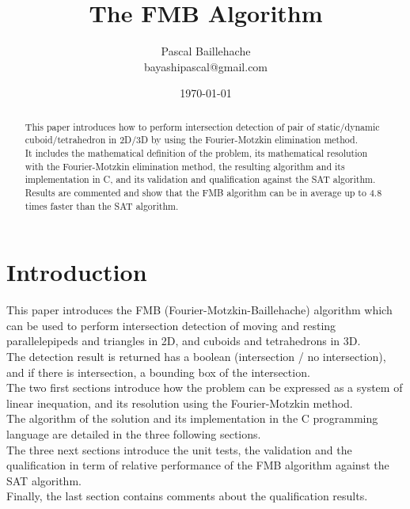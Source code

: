 \documentclass[12pt, a4paper]{article}
\begin{document}
\title{The FMB Algorithm}
\author{Pascal Baillehache\\bayashipascal@gmail.com}
\date{\today}
\maketitle

\begin{abstract}
This paper introduces how to perform intersection detection of pair of static/dynamic cuboid/tetrahedron in 2D/3D by using the Fourier-Motzkin elimination method.\\
It includes the mathematical definition of the problem, its mathematical resolution with the Fourier-Motzkin elimination method, the resulting algorithm and its implementation in C, and its validation and qualification against the SAT algorithm. Results are commented and show that the FMB algorithm can be in average up to 4.8 times faster than the SAT algorithm.
\end{abstract}

\newpage
\tableofcontents

\section*{Introduction}

This paper introduces the FMB (Fourier-Motzkin-Baillehache) algorithm which can be used to perform intersection detection of moving and resting parallelepipeds and triangles in 2D, and cuboids and tetrahedrons in 3D.\\

The detection result is returned has a boolean (intersection / no intersection), and if there is intersection, a bounding box of the intersection.\\

The two first sections introduce how the problem can be expressed as a system of linear inequation, and its resolution using the Fourier-Motzkin method.\\

The algorithm of the solution and its implementation in the C programming language are detailed in the three following sections.\\

The three next sections introduce the unit tests, the validation and the qualification in term of relative performance of the FMB algorithm against the SAT algorithm.\\

Finally, the last section contains comments about the qualification results.\\
\end{document}
